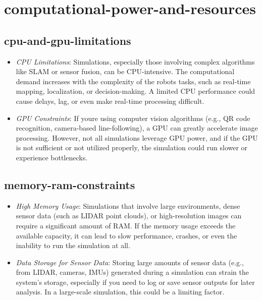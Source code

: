 \documentclass[../../main]{subfiles}
\begin{document}
    
    \section{computational-power-and-resources}    

    \subsection{cpu-and-gpu-limitations}

    \begin{itemize}
    \item
      \emph{CPU Limitations}: Simulations, especially those involving
      complex algorithms like SLAM or sensor fusion, can be CPU-intensive.
      The computational demand increases with the complexity of the
      robot\textquotesingle s tasks, such as real-time mapping,
      localization, or decision-making. A limited CPU performance could
      cause delays, lag, or even make real-time processing difficult.
    \item
      \emph{GPU Constraints}: If you\textquotesingle re using computer
      vision algorithms (e.g., QR code recognition, camera-based
      line-following), a GPU can greatly accelerate image processing.
      However, not all simulations leverage GPU power, and if the GPU is not
      sufficient or not utilized properly, the simulation could run slower
      or experience bottlenecks.
    \end{itemize}
    
    \subsection{memory-ram-constraints}   
    \begin{itemize}
    \item
      \emph{High Memory Usage}: Simulations that involve large
      environments, dense sensor data (such as LIDAR point clouds), or
      high-resolution images can require a significant amount of RAM. If the
      memory usage exceeds the available capacity, it can lead to slow
      performance, crashes, or even the inability to run the simulation at
      all.
    \item
      \emph{Data Storage for Sensor Data}: Storing large amounts of sensor
      data (e.g., from LIDAR, cameras, IMUs) generated during a simulation
      can strain the system's storage, especially if you need to log or save
      sensor outputs for later analysis. In a large-scale simulation, this
      could be a limiting factor.
    \end{itemize}
    
\end{document}

